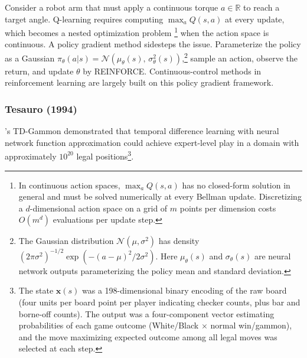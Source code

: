 Consider a robot arm that must apply a continuous torque $a \in \mathbb{R}$ to reach a target angle. Q-learning requires computing $\max_a Q(s,a)$ at every update, which becomes a nested optimization problem \footnote{In continuous action spaces, $\max_a Q(s,a)$ has no closed-form solution in general and must be solved numerically at every Bellman update. Discretizing a $d$-dimensional action space on a grid of $m$ points per dimension costs $O(m^d)$ evaluations per update step.} when the action space is continuous. A policy gradient method sidesteps the issue. Parameterize the policy as a Gaussian $\pi_\theta(a|s) = \mathcal{N}(\mu_\theta(s),\, \sigma_\theta^2(s))$,\footnote{The Gaussian distribution $\mathcal{N}(\mu, \sigma^2)$ has density $(2\pi\sigma^2)^{-1/2}\exp(-(a-\mu)^2/2\sigma^2)$. Here $\mu_\theta(s)$ and $\sigma_\theta(s)$ are neural network outputs parameterizing the policy mean and standard deviation.} sample an action, observe the return, and update $\theta$ by REINFORCE. Continuous-control methods in reinforcement learning are largely built on this policy gradient framework.


\subsubsection{Tesauro (1994)}

\citet{tesauro1994}'s TD-Gammon demonstrated that temporal difference learning with neural network function approximation could achieve expert-level play in a domain with approximately $10^{20}$ legal positions\footnote{The state $\mathbf{x}(s)$ was a 198-dimensional binary encoding of the raw board (four units per board point per player indicating checker counts, plus bar and borne-off counts). The output was a four-component vector estimating probabilities of each game outcome (White/Black $\times$ normal win/gammon), and the move maximizing expected outcome among all legal moves was selected at each step.}. 

